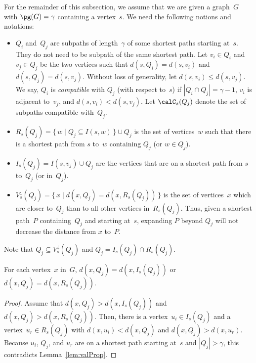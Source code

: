 For the remainder of this subsection, we assume that we are given a graph~$G$ with $\pg(G) = \gamma$ containing a vertex~$s$.
We need the following notions and notations:
\begin{itemize}
\item
$Q_{i}$ and~$Q_j$ are subpaths of length~$\gamma$ of some shortest paths starting at~$s$.
They do not need to be subpath of the same shortest path.
Let $v_i \in Q_i$ and $v_j \in Q_j$ be the two vertices such that $d(s, Q_i) = d(s, v_i)$ and  $d(s, Q_j) = d(s, v_j)$.
Without loss of generality, let $d(s, v_i) \leq d(s, v_j)$.
We say, $Q_{i}$ is \emph{compatible} with $Q_j$ (with respect to~$s$) if $|Q_{i} \cap Q_j| = \gamma - 1$, $v_{i}$ is adjacent to~$v_j$, and $d(s, v_i) < d(s, v_j)$.
Let $\calC_s(Q_j)$ denote the set of subpaths compatible with~$Q_j$.

\item
$R_s(Q_j) = \{ \, w \mid Q_j \subseteq I(s, w) \, \} \cup Q_j$ is the set of vertices~$w$ such that there is a shortest path from $s$ to~$w$ containing $Q_j$ (or $w \in Q_j$).

\item
$I_s(Q_j) = I(s, v_j) \cup Q_j$ are the vertices that are on a shortest path from $s$ to~$Q_j$ (or in~$Q_j$).

\item
$V^\downarrow_s(Q_j) = \{ \, x \mid d(x, Q_j) = d(x, R_s(Q_j)) \, \}$ is the set of vertices~$x$ which are closer to~$Q_j$ than to all other vertices in~$R_s(Q_j)$.
Thus, given a shortest path~$P$ containing~$Q_j$ and starting at~$s$, expanding $P$ beyond $Q_j$ will not decrease the distance from $x$ to~$P$.
\end{itemize}
Note that $Q_j \subseteq V^\downarrow_s(Q_j)$ and $Q_j = I_s(Q_j) \cap R_s(Q_j)$.

\begin{lemma}
    \label{lem:kValeyVert}
For each vertex~\( x \) in~\( G \), \( d(x, Q_j) = d(x, I_s(Q_j)) \) or \( d(x, Q_j) = d(x, R_s(Q_j)) \).
\end{lemma}

\begin{proof}
Assume that $d(x, Q_j) > d(x, I_s(Q_j))$ and $d(x, Q_j) > d(x, R_s(Q_j))$.
Then, there is a vertex~$u_i \in I_s(Q_j)$ and a vertex~$u_r \in R_s(Q_j)$ with $d(x, u_i) < d(x, Q_j)$ and $d(x, Q_j) > d(x, u_r)$.
Because $u_i$, $Q_j$, and $u_r$ are on a shortest path starting at~$s$ and $|Q_j| > \gamma$, this contradicts Lemma~\ref{lem:valProp}.
\end{proof}

